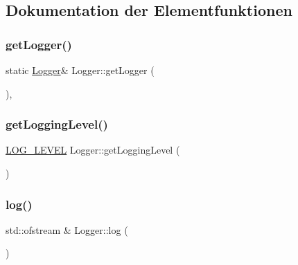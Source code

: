\subsection{Dokumentation der Elementfunktionen}
\hypertarget{class_logger_afa2765f0a04e7a50e1efc38cce67a763}{}\label{class_logger_afa2765f0a04e7a50e1efc38cce67a763} 
\subsubsection{\texorpdfstring{get\+Logger()}{getLogger()}}
{\footnotesize\ttfamily static \hyperlink{class_logger}{Logger}\& Logger\+::get\+Logger (\begin{DoxyParamCaption}{ }\end{DoxyParamCaption})\hspace{0.3cm}{\ttfamily [inline]}, {\ttfamily [static]}}

\hypertarget{class_logger_acce532a939622d2b5c919f5f67236564}{}\label{class_logger_acce532a939622d2b5c919f5f67236564} 
\subsubsection{\texorpdfstring{get\+Logging\+Level()}{getLoggingLevel()}}
{\footnotesize\ttfamily \hyperlink{_logger_8h_aa5a9053636a30269210c54e734e0d583}{L\+O\+G\+\_\+\+L\+E\+V\+EL} Logger\+::get\+Logging\+Level (\begin{DoxyParamCaption}{ }\end{DoxyParamCaption})}

\hypertarget{class_logger_af8a0b7a8939294ceb2cef39c358dfa9c}{}\label{class_logger_af8a0b7a8939294ceb2cef39c358dfa9c} 
\subsubsection{\texorpdfstring{log()}{log()}}
{\footnotesize\ttfamily std\+::ofstream \& Logger\+::log (\begin{DoxyParamCaption}{ }\end{DoxyParamCaption})}

\hypertarget{class_logger_a3759fa32a4f0c7255f61a2ce6484c194}{}\label{class_logger_a3759fa32a4f0c7255f61a2ce6484c194} 
